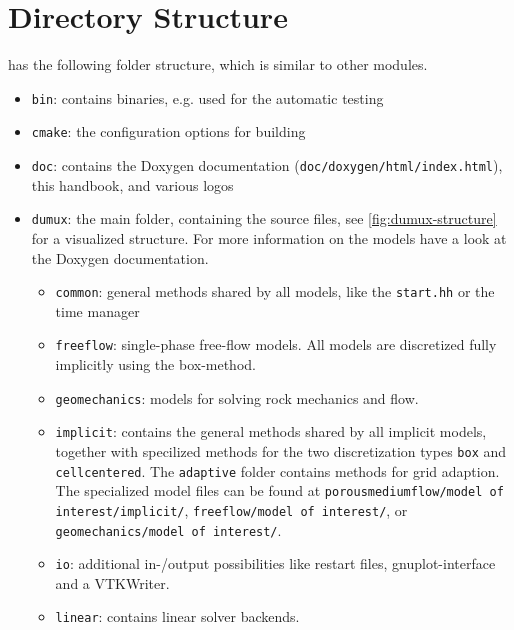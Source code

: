 \section{Directory Structure}
\label{sc_structure}

\Dumux has the following folder structure, which is similar to other \Dune modules.
\begin{itemize}
\item \texttt{bin}: contains binaries, e.g. used for the automatic testing
\item \texttt{cmake}: the configuration options for building \Dumux
\item \texttt{doc}: contains the Doxygen documentation (\texttt{doc/doxygen/html/index.html}),
                    this handbook, and various logos
\item \texttt{dumux}: the main folder, containing the source files, see \ref{fig:dumux-structure}
      for a visualized structure. For more information on the models have a look at the
      Doxygen documentation.
  \begin{itemize}
  \item \texttt{common}: general methods shared by all models, 
         like the \texttt{start.hh} or the time manager

  \item \texttt{freeflow}: single-phase free-flow models. All models are discretized
         fully implicitly using the box-method.

  \item \texttt{geomechanics}: models for solving rock mechanics and flow.

  \item \texttt{implicit}: contains the general methods shared
         by all implicit models, together with specilized methods
         for the two discretization types \texttt{box} and \texttt{cellcentered}. 
         The \texttt{adaptive} folder contains methods for grid adaption. 
         The specialized model files can be found 
         at \texttt{porousmediumflow/model of interest/implicit/},
         \texttt{freeflow/model of interest/}, or \texttt{geomechanics/model of interest/}.

  \item \texttt{io}: additional in-/output possibilities like restart files,
        gnuplot-interface and a VTKWriter.

  \item \texttt{linear}: contains linear solver backends.


\end{itemize}
\end{itemize}
